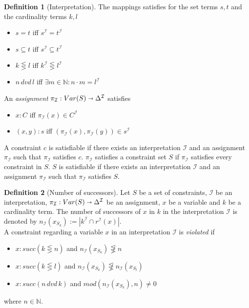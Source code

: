 \documentclass[a4paper,11pt]{scrartcl}
\theoremstyle{break}
\theoremstyle{definition}
\newtheorem{mydef}{Definition}
\begin{document}
\begin{mydef}[Interpretation]
The mappings satisfies for the set terms $s,t$ and the cardinality terms $k,l$
\begin{itemize}
\item $s=t$ iff $s^\mathcal{I}=t^\mathcal{I}$
\item $s\subseteq t$ iff $s^\mathcal{I}\subseteq t^\mathcal{I}$
\item $k\lesseqgtr l$ iff $k^\mathcal{I}\lesseqgtr l^\mathcal{I}$
\item $n\,dvd\,l$ iff $\exists m\in\mathbb{N}:n\cdot m = l^\mathcal{I}$
\end{itemize}
An \textit{assignment} $\pi_\mathcal{I}: Var(S)\shortrightarrow \Delta^\mathcal{I}$ satisfies 
\begin{itemize}
\item $x:C$ iff $\pi_\mathcal{I}(x)\in C^\mathcal{I}$ 
\item $(x,y):s$ iff $(\pi_\mathcal{I}(x),\pi_\mathcal{I}(y))\in s^\mathcal{I}$
\end{itemize} 
A constraint $c$ is satisfiable if there exists an interpretation $\mathcal{I}$ and an assignment $\pi_\mathcal{I}$ such that $\pi_\mathcal{I}$ satisfies $c$. $\pi_\mathcal{I}$ satisfies a constraint set $S$ if $\pi_\mathcal{I}$ satisfies every constraint in $S$. $S$ is satisfiable if there exists an interpretation $\mathcal{I}$ and an assignment $\pi_\mathcal{I}$ such that $\pi_\mathcal{I}$ satisfies $S$.
\end{mydef}
\begin{mydef}[Number of successors]
Let $S$ be a set of constraints, $\mathcal{I}$ be an interpretation, $\pi_\mathcal{I}:Var(S)\shortrightarrow \Delta^\mathcal{I}$ be an assignment, $x$ be a variable and $k$ be a cardinality term. The number of successors of $x$ in $k$ in the interpretation $\mathcal{I}$ is denoted by $n_\mathcal{I}(x_{S_k}):=|k^\mathcal{I}\cap r^\mathcal{I}(x)|$.\\
A constraint regarding a variable $x$ in an interpretation $\mathcal{I}$ is \textit{violated} if
\begin{itemize}
\item $x:succ(k\lesseqgtr n)$ and $n_\mathcal{I}(x_{S_k})\not\lesseqgtr n$
\item $x:succ(k\lesseqgtr l)$ and $n_\mathcal{I}(x_{S_k})\not\lesseqgtr n_\mathcal{I}(x_{S_l})$
\item $x:succ(n\,dvd\,k)$ and $mod(n_\mathcal{I}(x_{S_k}),n)\neq 0$
\end{itemize} 
where $n\in\mathbb{N}$.
\end{mydef}
\end{document}
